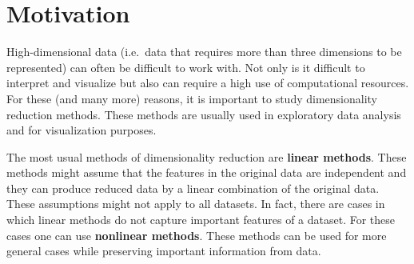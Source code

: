 \section{Motivation}\label{sec:motivation}
High-dimensional data (i.e.\ data that requires more than three dimensions to be represented) can often be difficult to work with. Not only is it difficult to interpret and visualize but also can require a high use of computational resources. For these (and many more) reasons, it is important to study dimensionality reduction methods. These methods are usually used in exploratory data analysis and for visualization purposes.

The most usual methods of dimensionality reduction are \textbf{linear methods}. These methods might assume that the features in the original data are independent and they can produce reduced data by a linear combination of the original data. These assumptions might not apply to all datasets. In fact, there are cases in which linear methods do not capture important features of a dataset. For these cases one can use \textbf{nonlinear methods}. These methods can be used for more general cases while preserving important information from data.
